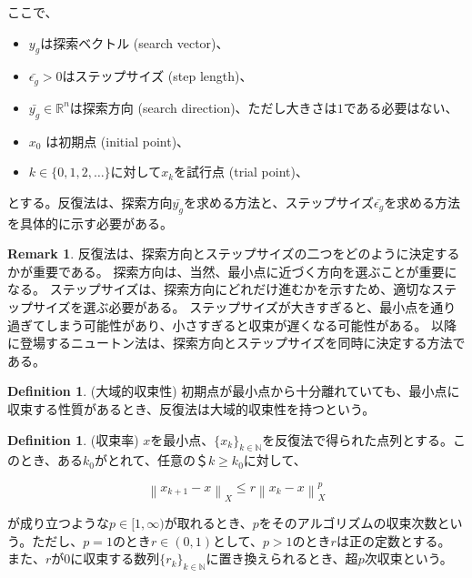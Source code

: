 \documentclass[a4paper,11pt]{jsarticle}
\theoremstyle{definition}
\newtheorem{dfn}[thm]{Definition}
\newtheorem{rem}[thm]{Remark}
\newcommand{\NaturalNumberSet}{\mathbb{N}}
\newcommand{\RealNumberSet}{\mathbb{R}}
\newcommand{\Norm}[1]{\left\lVert {#1} \right\rVert} %
\begin{document}
ここで、

\begin{itemize}
  \item $y_{g}$は探索ベクトル (search vector)、
  \item $\bar{\epsilon_{g}} > 0$はステップサイズ (step length)、
  \item $\bar{y_{g}} \in \RealNumberSet^n$は探索方向 (search direction)、ただし大きさは$1$である必要はない、
  \item $x_0$ は初期点 (initial point)、
  \item $k \in \{0, 1, 2, \ldots\}$に対して$x_k$を試行点 (trial point)、
\end{itemize}

とする。反復法は、探索方向$\bar{y_{g}}$を求める方法と、ステップサイズ$\bar{\epsilon_{g}}$を求める方法を具体的に示す必要がある。

\begin{rem}
  反復法は、探索方向とステップサイズの二つをどのように決定するかが重要である。
  探索方向は、当然、最小点に近づく方向を選ぶことが重要になる。
  ステップサイズは、探索方向にどれだけ進むかを示すため、適切なステップサイズを選ぶ必要がある。
  ステップサイズが大きすぎると、最小点を通り過ぎてしまう可能性があり、小さすぎると収束が遅くなる可能性がある。
  以降に登場するニュートン法は、探索方向とステップサイズを同時に決定する方法である。
\end{rem}

\begin{dfn}{(大域的収束性)}
  初期点が最小点から十分離れていても、最小点に収束する性質があるとき、反復法は大域的収束性を持つという。
\end{dfn}

\begin{dfn}(収束率)
  $x$を最小点、$\{x_k\}_{k \in \NaturalNumberSet}$を反復法で得られた点列とする。このとき、ある$k_0$がとれて、任意の＄$k \geq k_0$に対して、

  \begin{equation}
    \label{eq:convergence_rate}
    \Norm{x_{k+1} - x}_{X} \leq r \Norm{x_k - x}^{p}_{X} \tag{3.2.2}
  \end{equation}

  が成り立つような$p \in [1, \infty)$が取れるとき、$p$をそのアルゴリズムの収束次数という。ただし、$p = 1$のとき$r \in (0,1)$として、$p >1$のとき$r$は正の定数とする。
  また、$r$が$0$に収束する数列$\{r_k\}_{k \in \NaturalNumberSet}$に置き換えられるとき、超$p$次収束という。
\end{dfn}
\end{document}
